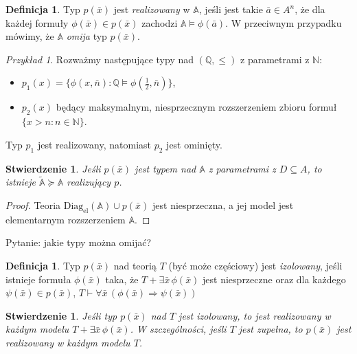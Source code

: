 \documentclass{article}
\newcommand{\N}{\mathbb{N}}
\newcommand{\Q}{\mathbb{Q}}
\newcommand{\A}{\mathbb{A}}
\theoremstyle{plain}
\newtheorem{stw}[thm]{Stwierdzenie}
\theoremstyle{definition}
\newtheorem{df}[thm]{Definicja}
\theoremstyle{remark}
\newtheorem{prz}[thm]{Przykład}
\newcommand{\DiagEl}{\text{Diag}_{\text{el}}}
\begin{document}
\begin{df}
	Typ $p(\bar{x})$ jest \textit{realizowany} w $\A$, jeśli jest takie $\bar{a} \in A^n$, że dla każdej formuły $\phi(\bar{x}) \in p(\bar{x})$ zachodzi $\A \models \phi(\bar{a})$.
	W przeciwnym przypadku mówimy, że $\A$ \textit{omija} typ $p(\bar{x})$.
\end{df}

\begin{prz}
	Rozważmy następujące typy nad $(\Q, \leq)$ z parametrami z $\N$:
	\begin{itemize}
		\item $p_1(x) = \{\phi(x, \bar{n}) \colon \Q \models \phi(\frac{1}{2}, \bar{n})\}$,
		\item $p_2(x)$ będący maksymalnym, niesprzecznym rozszerzeniem zbioru formuł $\{x > n \colon n \in \N\}$.
	\end{itemize}
	Typ $p_1$ jest realizowany, natomiast $p_2$ jest ominięty.
\end{prz}

\begin{stw}
	Jeśli $p(\bar{x})$ jest typem nad $\A$ z parametrami z $D \subseteq A$,
	 to istnieje $\tilde{\A} \succcurlyeq \A$ realizujący $p$.
\end{stw}
\begin{proof}
	Teoria $\DiagEl(\A) \cup p(\bar{x})$ jest niesprzeczna, a jej model jest elementarnym rozszerzeniem $\A$.
\end{proof}


Pytanie: jakie typy można omijać?


\begin{df}
	Typ $p(\bar{x})$ nad teorią $T$ (być może częściowy) jest \textit{izolowany},
	jeśli istnieje formuła $\phi(\bar{x})$ taka, że $T + \exists \bar{x}\, \phi(\bar{x})$ jest niesprzeczne oraz dla każdego $\psi(\bar{x}) \in p(\bar{x})$, $T \vdash \forall \bar{x} \, (\phi(\bar{x}) \Rightarrow \psi(\bar{x}))$
\end{df}

\begin{stw}
	Jeśli typ $p(\bar{x})$ nad $T$ jest izolowany, to jest realizowany w każdym modelu $T + \exists \bar{x} \, \phi(\bar{x})$.
	W szczególności, jeśli $T$ jest zupełna, to $p(\bar{x})$ jest realizowany w każdym modelu $T$.
\end{stw}
\end{document}
